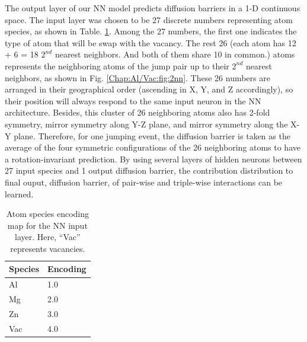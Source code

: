 The output layer of our \ac{NN} model predicts diffusion barriers in a 1-D continuous space. The input layer was chosen to be 27 discrete numbers representing atom species, as shown in Table. \ref{Chap:Al/Vac:tab:mapping}. Among the 27 numbers, the first one indicates the type of atom that will be swap with the vacancy. The rest 26 (each atom has 12 + 6 = 18 $\text{2}^{nd}$ nearest neighbors. And both of them share 10 in common.) atoms represents the neighboring atoms of the jump pair up to their $\text{2}^{nd}$ nearest neighbors, as shown in Fig. \ref{Chap:Al/Vac:fig:2nn}. These 26 numbers are arranged in their geographical order (ascending in X, Y, and Z accordingly), so their position will always respond to the same input neuron in the \ac{NN} architecture. Besides, this cluster of 26 neighboring atoms also has 2-fold symmetry, mirror symmetry along Y-Z plane, and mirror symmetry along the X-Y plane. Therefore, for one jumping event, the diffusion barrier is taken as the average of the four symmetric configurations of the 26 neighboring atoms to have a rotation-invariant prediction. By using several layers of hidden neurons between 27 input species and 1 output diffusion barrier, the contribution distribution to final ouput, diffusion barrier, of pair-wise and triple-wise interactions can be learned.


\begin{table}[!htbp]
\centering
\caption[Atom species encoding map for the \acf{NN} input layer.]{Atom species encoding map for the \acf{NN} input layer. Here, ``Vac'' represents vacancies.}
\label{Chap:Al/Vac:tab:mapping}
\begin{tabular}{ll}
\\
\hline
\hline
Species & Encoding  \\ \hline
Al & 1.0 \\
Mg & 2.0 \\
Zn & 3.0 \\
Vac & 4.0 \\
\hline
\hline
\end{tabular}
\end{table}


